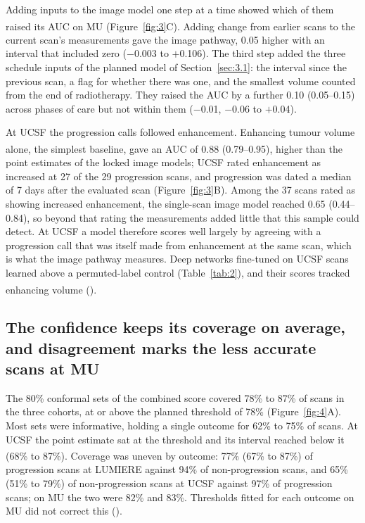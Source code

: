 \documentclass[largeformat]{interact} %
\newcommand{\expl}{\textsuperscript{\textdagger}}
\begin{document}
Adding inputs to the image model one step at a time showed which of them raised its AUC on MU\expl{}
(Figure~\ref{fig:3}C). Adding
change from earlier scans to the current scan's measurements gave the image pathway, 0.05 higher with an interval
that included zero ($-$0.003 to $+$0.106). The third step added the three schedule inputs of the planned model of
Section~\ref{sec:3.1}: the interval since the previous scan, a flag for whether there was one, and the smallest volume
counted from the end of radiotherapy. They raised the AUC by a further 0.10 (0.05--0.15) across phases of care but not
within them ($-$0.01, $-$0.06 to $+$0.04).

At UCSF the progression calls followed enhancement. Enhancing tumour volume alone, the simplest baseline, gave
an AUC of 0.88 (0.79--0.95)\expl, higher than the point estimates of the locked image models; UCSF rated enhancement as
increased at 27 of the 29 progression scans, and progression was dated a median of 7 days after the evaluated scan
(Figure~\ref{fig:3}B). Among the 37 scans rated as showing increased enhancement, the single-scan image model reached
0.65 (0.44--0.84), so beyond that rating the measurements added little that this sample could detect. At UCSF a model therefore scores well
largely by agreeing with a progression call that was itself made from enhancement at the same scan, which is what the
image pathway measures. Deep networks fine-tuned on UCSF scans learned above a permuted-label control
(Table~\ref{tab:2}), and their scores tracked enhancing volume\expl{} (). 

\subsection{The confidence keeps its coverage on average, and disagreement marks the less accurate scans at MU}\label{sec:3.4}

The 80\% conformal sets of the combined score covered 78\% to 87\% of scans in the three cohorts, at or above the planned threshold of 78\% (Figure~\ref{fig:4}A). Most sets were informative, holding a single outcome for 62\% to 75\% of scans. At UCSF the
point estimate sat at the threshold and its interval reached below it (68\% to 87\%). Coverage was uneven by outcome\expl: 77\% (67\% to 87\%) of progression scans at LUMIERE against 94\% of
non-progression scans, and 65\% (51\% to 79\%) of non-progression scans at UCSF against 97\% of progression scans; on
MU the two were 82\% and 83\%. Thresholds fitted for each outcome on MU did
not correct this ().
\end{document}
